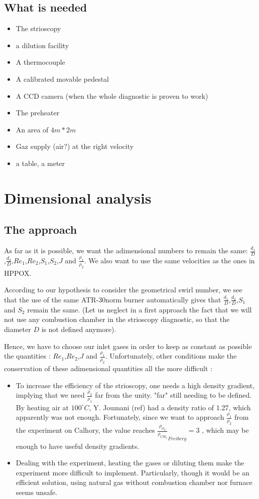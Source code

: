 \subsection{What is needed}

\begin{itemize}
\item The strioscopy
\item a dilution facility 
\item A thermocouple
\item A calibrated movable pedestal
\item A CCD camera (when the whole diagnostic is proven to work)
\item The preheater
\item An area of $4m * 2m$
\item Gaz supply (air?) at the right velocity
\item a table, a meter
\end{itemize}
\section{Dimensional analysis}
\subsection{The approach}
As far as it is possible, we want the adimensional numbers to remain the same: $\frac{d_{1}}{D}$,$\frac{d_{2}}{D}$,$Re_{1}$,$Re_{2}$,$S_{1}$,$S_{2}$,$J$ and $\frac{\rho_{1}}{\rho_{2}}$. We also want to use the same velocities as the ones in HPPOX. 

According to our hypothesis to consider the geometrical swirl number, we see that the use of the same ATR-30norm burner automatically gives that $\frac{d_{1}}{D}$,$\frac{d_{2}}{D}$,$S_{1}$ and $S_{2}$ remain the same. (Let us neglect in a first approach the fact that we will not use any combustion chamber in the strioscopy diagnostic, so that the diameter $D$ is not defined anymore). 

Hence, we have to choose our inlet gases in order to keep as constant as possible the quantities : $Re_{1}$,$Re_{2}$,$J$ and $\frac{\rho_{1}}{\rho_{2}}$. Unfortunately, other conditions make the conservation of these adimensional quantities all the more difficult :
\begin{itemize}
\item To increase the efficiency of the strioscopy, one needs a high density gradient, implying that we need   $\frac{\rho_{2}}{\rho_{1}}$ far from the unity. "far" still needing to be defined. By heating air at $100^\circ C$, Y. Joumani (ref) had a density ratio of 1.27, which apparently was not enough. Fortunately, since we want to approach $\frac{\rho_{1}}{\rho_{2}}$ from the experiment on Calhory, the value reaches $\frac{\rho_{O_{2}}}{\rho_{CH_{4}}}_{Freiberg}=3$ , which may be enough to have useful density gradients.
\item Dealing with the experiment, heating the gases or diluting them make the experiment more difficult to implement. Particularly, though it would be an efficient solution, using natural gas without combustion chamber nor furnace seems unsafe.
\end{itemize}

